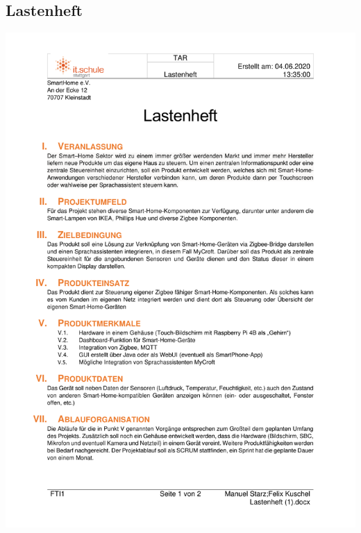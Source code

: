 \subsection{Lastenheft}\label{ah_lastenheft}
\includegraphics*[width=1\textwidth, page=1]{pdf/lastenheft.pdf}
\newpage
